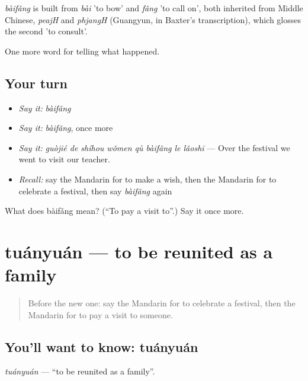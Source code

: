\begin{cousinweb}
\emph{bàifǎng} is built from \emph{bài} 'to bow' and \emph{fǎng} 'to call on', both inherited from Middle Chinese, \emph{peajH} and \emph{phjangH} (Guangyun, in Baxter's transcription), which glosses the second 'to consult'.
\end{cousinweb}

\begin{grammarlens}[title={What you've built}]
One more word for telling what happened.
\end{grammarlens}

\subsection*{Your turn}
\begin{itemize}
\raggedright
  \item \emph{Say it:} \emph{bàifǎng}
  \item \emph{Say it:} \emph{bàifǎng}, once more
  \item \emph{Say it:} \emph{guòjié de shíhou wǒmen qù bàifǎng le lǎoshī} — Over the festival we went to visit our teacher.
  \item \emph{Recall:} say the Mandarin for to make a wish, then the Mandarin for to celebrate a festival, then say \emph{bàifǎng} again
\end{itemize}

\begin{tcolorbox}[breakable,colback=teal!4,colframe=teal!35!black,title={Before you move on}]
What does bàifǎng mean? (\textquotedblleft{}To pay a visit to\textquotedblright{}.) Say it once more.
\end{tcolorbox}
\section[tuányuán]{tuányuán — to be reunited as a family}

\label{lesson:ZH-C338-tuanyuan}



\begin{quote}
Before the new one: say the Mandarin for to celebrate a festival, then the Mandarin for to pay a visit to someone.
\end{quote}

\subsection*{You'll want to know: tuányuán}
\emph{tuányuán} — \textquotedblleft{}to be reunited as a family\textquotedblright{}.

